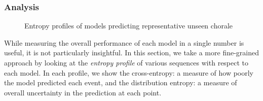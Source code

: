 \documentclass[12pt,a4paper,twoside,openright]{report}
\begin{document}
\subsubsection{Analysis}
\vspace{-4mm}
\begin{figure}[H]
\centering
{}

\caption{Entropy profiles of models predicting representative unseen chorale}
\label{fig:aus-meines-profiles}
\end{figure}

While measuring the overall performance of each model in a single number is
useful, it is not particularly insightful. In this section, we take a more
fine-grained approach by looking at the \emph{entropy profile} of various
sequences with respect to each model. In each profile, we show the
cross-entropy: a measure of how poorly the model predicted each event, and the
distribution entropy: a measure of overall uncertainty in the prediction at each
point.
\end{document}
